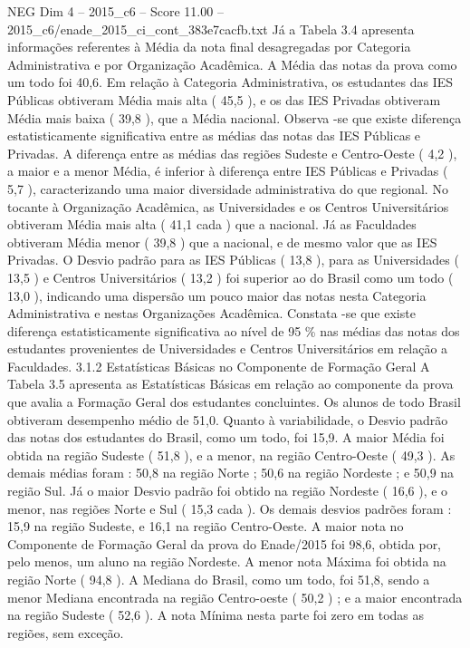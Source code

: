\begin{textsample}{NEG Dim 4 – 2015\_c6 – Score 11.00 – 2015\_c6/enade\_2015\_ci\_cont\_383e7cacfb.txt}
Já a Tabela 3.4 apresenta informações referentes à Média da nota final desagregadas por Categoria Administrativa e por Organização Acadêmica.
A Média das notas da prova como um todo foi 40,6.
Em relação à Categoria Administrativa, os estudantes das IES Públicas obtiveram Média mais alta ( 45,5 ), e os das IES Privadas obtiveram Média mais baixa ( 39,8 ), que a Média nacional.
Observa -se que existe diferença estatisticamente significativa entre as médias das notas das IES Públicas e Privadas.
A diferença entre as médias das regiões Sudeste e Centro-Oeste ( 4,2 ), a maior e a menor Média, é inferior à diferença entre IES Públicas e Privadas ( 5,7 ), caracterizando uma maior diversidade administrativa do que regional.
No tocante à Organização Acadêmica, as Universidades e os Centros Universitários obtiveram Média mais alta ( 41,1 cada ) que a nacional.
Já as Faculdades obtiveram Média menor ( 39,8 ) que a nacional, e de mesmo valor que as IES Privadas.
O Desvio padrão para as IES Públicas ( 13,8 ), para as Universidades ( 13,5 ) e Centros Universitários ( 13,2 ) foi superior ao do Brasil como um todo ( 13,0 ), indicando uma dispersão um pouco maior das notas nesta Categoria Administrativa e nestas Organizações Acadêmica.
Constata -se que existe diferença estatisticamente significativa ao nível de 95 \% nas médias das notas dos estudantes provenientes de Universidades e Centros Universitários em relação a Faculdades. 3.1.2 Estatísticas Básicas no Componente de Formação Geral A Tabela 3.5 apresenta as Estatísticas Básicas em relação ao componente da prova que avalia a Formação Geral dos estudantes concluintes.
Os alunos de todo Brasil obtiveram desempenho médio de 51,0.
Quanto à variabilidade, o Desvio padrão das notas dos estudantes do Brasil, como um todo, foi 15,9.
A maior Média foi obtida na região Sudeste ( 51,8 ), e a menor, na região Centro-Oeste ( 49,3 ).
As demais médias foram : 50,8 na região Norte ; 50,6 na região Nordeste ; e 50,9 na região Sul.
Já o maior Desvio padrão foi obtido na região Nordeste ( 16,6 ), e o menor, nas regiões Norte e Sul ( 15,3 cada ).
Os demais desvios padrões foram : 15,9 na região Sudeste, e 16,1 na região Centro-Oeste.
A maior nota no Componente de Formação Geral da prova do Enade/2015 foi 98,6, obtida por, pelo menos, um aluno na região Nordeste.
A menor nota Máxima foi obtida na região Norte ( 94,8 ).
A Mediana do Brasil, como um todo, foi 51,8, sendo a menor Mediana encontrada na região Centro-oeste ( 50,2 ) ; e a maior encontrada na região Sudeste ( 52,6 ).
A nota Mínima nesta parte foi zero em todas as regiões, sem exceção.

\end{textsample}
